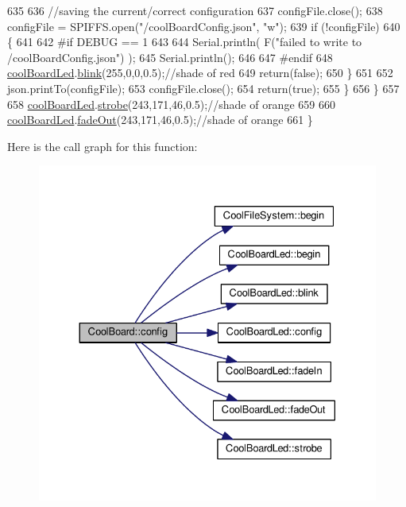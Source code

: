 \begin{DoxyCode}
635 
636             \textcolor{comment}{//saving the current/correct configuration}
637             configFile.close();
638             configFile = SPIFFS.open(\textcolor{stringliteral}{"/coolBoardConfig.json"}, \textcolor{stringliteral}{"w"});
639             \textcolor{keywordflow}{if} (!configFile)
640             \{
641             
642 \textcolor{preprocessor}{            #if DEBUG == 1}
643 
644                 Serial.println( F(\textcolor{stringliteral}{"failed to write to /coolBoardConfig.json"}) );
645                 Serial.println();
646             
647 \textcolor{preprocessor}{            #endif}
648                 \hyperlink{classCoolBoard_a1b1d3c684a5baa56b08486e192fd8e97}{coolBoardLed}.\hyperlink{classCoolBoardLed_a96e1ea13003eee34c9dbcef340404426}{blink}(255,0,0,0.5);\textcolor{comment}{//shade of red     }
649                 \textcolor{keywordflow}{return}(\textcolor{keyword}{false});
650             \}
651 
652             json.printTo(configFile);
653             configFile.close();
654             \textcolor{keywordflow}{return}(\textcolor{keyword}{true});
655         \}
656     \}
657 
658     \hyperlink{classCoolBoard_a1b1d3c684a5baa56b08486e192fd8e97}{coolBoardLed}.\hyperlink{classCoolBoardLed_ad5f0de4c628cbfbf49896042831c64ad}{strobe}(243,171,46,0.5);\textcolor{comment}{//shade of orange}
659     
660     \hyperlink{classCoolBoard_a1b1d3c684a5baa56b08486e192fd8e97}{coolBoardLed}.\hyperlink{classCoolBoardLed_a93d545679237e8cc858324367149775c}{fadeOut}(243,171,46,0.5);\textcolor{comment}{//shade of orange               }
661 \}
\end{DoxyCode}
Here is the call graph for this function\+:\nopagebreak
\begin{figure}[H]
\begin{center}
\leavevmode
\includegraphics[width=330pt]{classCoolBoard_a583a874c09c07e70a6eb9229fc4beddb_cgraph}
\end{center}
\end{figure}
\mbox{\label{classCoolBoard_a519de78b807f8ec6463ff484eb925918}} 

